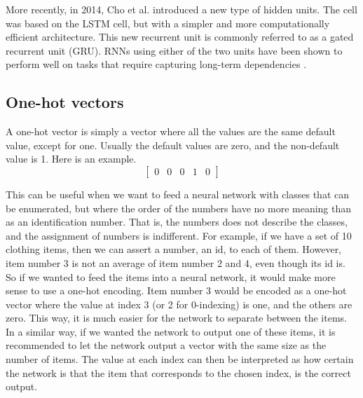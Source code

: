 More recently, in 2014, Cho et al. \cite{DBLP:journals/corr/ChoMGBSB14} introduced a new type of hidden units. The cell was based on the LSTM cell, but with a simpler and more computationally efficient architecture. This new recurrent unit is commonly referred to as a gated recurrent unit (GRU). RNNs using either of the two units have been shown to perform well on tasks that require capturing long-term dependencies \cite{DBLP:journals/corr/ChungGCB14}.

\subsection{One-hot vectors}
A one-hot vector is simply a vector where all the values are the same default value, except for one. Usually the default values are zero, and the non-default value is 1. Here is an example.
\[
\begin{bmatrix}
0 & 0 & 0 & 1 & 0
\end{bmatrix}
\]

This can be useful when we want to feed a neural network with classes that can be enumerated, but where the order of the numbers have no more meaning than as an identification number. That is, the numbers does not describe the classes, and the assignment of numbers is indifferent. For example, if we have a set of 10 clothing items, then we can assert a number, an id, to each of them. However, item number 3 is not an average of item number 2 and 4, even though its id is. So if we wanted to feed the items into a neural network, it would make more sense to use a one-hot encoding. Item number 3 would be encoded as a one-hot vector where the value at index 3 (or 2 for 0-indexing) is one, and the others are zero. This way, it is much easier for the network to separate between the items. In a similar way, if we wanted the network to output one of these items, it is recommended to let the network output a vector with the same size as the number of items. The value at each index can then be interpreted as how certain the network is that the item that corresponds to the chosen index, is the correct output. 

